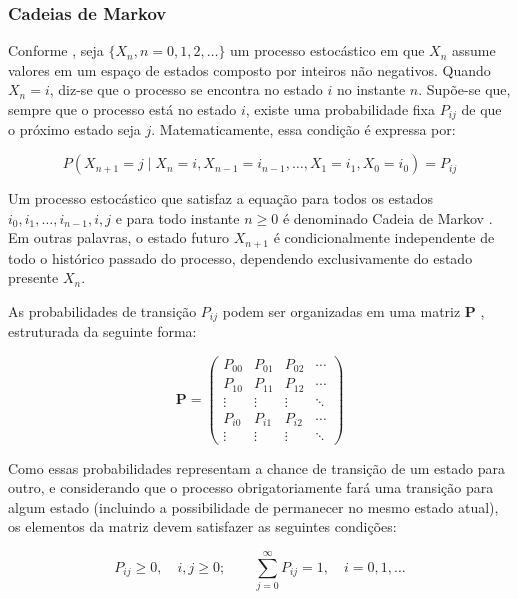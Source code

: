 \documentclass[
    12pt,                %
    openright,           %
    oneside,             %
    a4paper,             %
    english,             %
    brazil               %
]{abntex2}
\begin{document}
\subsubsection{Cadeias de Markov}
Conforme , seja $\{X_n, n = 0, 1, 2, \dots\}$ um processo estocástico em que $X_n$ assume valores em um espaço de estados composto por inteiros não negativos. Quando $X_n = i$, 
diz-se que o processo se encontra no estado $i$ no instante $n$. Supõe-se que, sempre que o processo está no estado $i$, existe uma probabilidade fixa $P_{ij}$ de que 
o próximo estado seja $j$. Matematicamente, essa condição é expressa por:

\begin{equation}
    P(X_{n+1} = j \mid X_n = i, X_{n-1} = i_{n-1}, \dots, X_1 = i_1, X_0 = i_0) = P_{ij}
\end{equation}

Um processo estocástico que satisfaz a equação para todos os estados $i_0, i_1, \dots, i_{n-1}, i, j$ e para todo instante $n \geq 0$ é denominado Cadeia de Markov \cite{ROSS}. 
Em outras palavras, o estado futuro $X_{n+1}$ é condicionalmente independente de todo o histórico passado do processo, dependendo exclusivamente do estado presente 
$X_n$.

As probabilidades de transição $P_{ij}$ podem ser organizadas em uma matriz $\mathbf{P}$ \cite{ROSS}, estruturada da seguinte forma:

\begin{equation*}
\mathbf{P} = \begin{pmatrix}
    P_{00} & P_{01} & P_{02} & \cdots \\
    P_{10} & P_{11} & P_{12} & \cdots \\
    \vdots & \vdots & \vdots & \ddots \\
    P_{i0} & P_{i1} & P_{i2} & \cdots \\
    \vdots & \vdots & \vdots & \ddots
\end{pmatrix}
\end{equation*}

\vspace{0.5cm}

Como essas probabilidades representam a chance de transição de um estado para outro, e considerando que o processo obrigatoriamente fará uma transição para algum 
estado (incluindo a possibilidade de permanecer no mesmo estado atual), os elementos da matriz devem satisfazer as seguintes condições:

\begin{equation*}
    P_{ij} \geq 0, \quad i,j \geq 0; \qquad \sum_{j=0}^{\infty} P_{ij} = 1, \quad i = 0, 1, \dots
\end{equation*}
\end{document}
